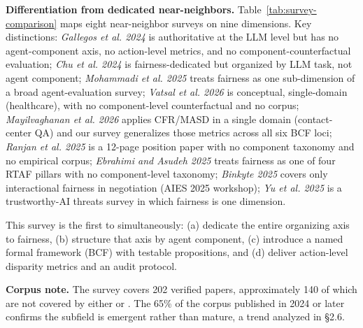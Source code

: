\documentclass[acmsmall,nonacm]{acmart}
\begin{document}
\textbf{Differentiation from dedicated near-neighbors.} Table~\ref{tab:survey-comparison} maps eight near-neighbor surveys on nine dimensions. Key distinctions: \emph{Gallegos et al. 2024} \cite{gallegos2024bias} is authoritative at the LLM level but has no agent-component axis, no action-level metrics, and no component-counterfactual evaluation; \emph{Chu et al. 2024} \cite{chu2024fairness} is fairness-dedicated but organized by LLM task, not agent component; \emph{Mohammadi et al. 2025} \cite{mohammadi2025evaluation} treats fairness as one sub-dimension of a broad agent-evaluation survey; \emph{Vatsal et al. 2026} \cite{vatsal2026agentic} is conceptual, single-domain (healthcare), with no component-level counterfactual and no corpus; \emph{Mayilvaghanan et al. 2026} \cite{mayilvaghanan2026counterfactual} applies CFR/MASD in a single domain (contact-center QA) and our survey generalizes those metrics across all six BCF loci; \emph{Ranjan et al. 2025} \cite{ranjan2025fairness} is a 12-page position paper with no component taxonomy and no empirical corpus; \emph{Ebrahimi and Asudeh 2025} \cite{ebrahimi2025survey} treats fairness as one of four RTAF pillars with no component-level taxonomy; \emph{Binkyte 2025} \cite{binkyte2025interactional} covers only interactional fairness in negotiation (AIES 2025 workshop); \emph{Yu et al. 2025} \cite{yu2025survey} is a trustworthy-AI threats survey in which fairness is one dimension.

This survey is the first to simultaneously: (a) dedicate the entire organizing axis to fairness, (b) structure that axis by agent component, (c) introduce a named formal framework (BCF) with testable propositions, and (d) deliver action-level disparity metrics and an audit protocol.

\textbf{Corpus note.} The survey covers 202 verified papers, approximately 140 of which are not covered by either \cite{gallegos2024bias} or \cite{chu2024fairness}. The 65\% of the corpus published in 2024 or later confirms the subfield is emergent rather than mature, a trend analyzed in \S{}2.6.
\end{document}
